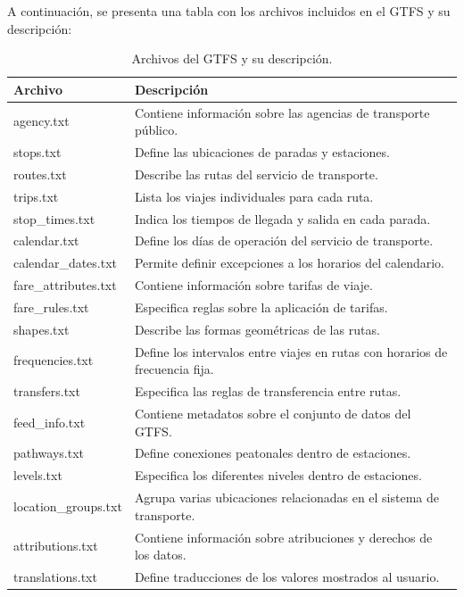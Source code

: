 \documentclass[openany]{book}
\begin{document}
		A continuación, se presenta una tabla con los archivos incluidos en el GTFS y su descripción:

		\begin{table}[h]
			\centering
			\begin{tabular}{|l|p{10cm}|}
				\hline
				\textbf{Archivo} & \textbf{Descripción} \\
				\hline
				agency.txt & Contiene información sobre las agencias de transporte público. \\
				stops.txt & Define las ubicaciones de paradas y estaciones. \\
				routes.txt & Describe las rutas del servicio de transporte. \\
				trips.txt & Lista los viajes individuales para cada ruta. \\
				stop\_times.txt & Indica los tiempos de llegada y salida en cada parada. \\
				calendar.txt & Define los días de operación del servicio de transporte. \\
				calendar\_dates.txt & Permite definir excepciones a los horarios del calendario. \\
				fare\_attributes.txt & Contiene información sobre tarifas de viaje. \\
				fare\_rules.txt & Especifica reglas sobre la aplicación de tarifas. \\
				shapes.txt & Describe las formas geométricas de las rutas. \\
				frequencies.txt & Define los intervalos entre viajes en rutas con horarios de frecuencia fija. \\
				transfers.txt & Especifica las reglas de transferencia entre rutas. \\
				feed\_info.txt & Contiene metadatos sobre el conjunto de datos del GTFS. \\
				pathways.txt & Define conexiones peatonales dentro de estaciones. \\
				levels.txt & Especifica los diferentes niveles dentro de estaciones. \\
				location\_groups.txt & Agrupa varias ubicaciones relacionadas en el sistema de transporte. \\
				attributions.txt & Contiene información sobre atribuciones y derechos de los datos. \\
				translations.txt & Define traducciones de los valores mostrados al usuario. \\

				\hline
			\end{tabular}
			\caption{Archivos del GTFS y su descripción.}
			\label{tab:gtfs_files}
		\end{table}
\end{document}
